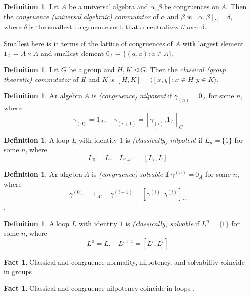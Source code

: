\documentclass[12pt]{report}
\theoremstyle{definition}
\newtheorem{fct}[thm]{Fact}
\newtheorem{dfn}[thm]{Definition}
\begin{document}
\begin{dfn}
  Let $A$ be a universal algebra and $\alpha, \beta$ be congruences on $A$. Then the
    \emph{congruence (universal algebraic) commutator} of $\alpha$ and $\beta$ is
    $[\alpha, \beta]_C = \delta$, where $\delta$ is the smallest congruence such that
    $\alpha$ centralizes $\beta$ over $\delta$. 

  Smallest here is in terms of the lattice of congruences of $A$ with largest element
    $1_A = A\times A$ and smallest element $0_A = \{(a, a) : a\in A\}$.
\end{dfn}

\begin{dfn}
  Let $G$ be a group and $H, K\unlhd G$. Then the \emph{classical (group theoretic) commutator}
    of $H$ and $K$ is $[H, K] = \langle [x, y] : x\in H, y\in K\rangle$.
\end{dfn}

\begin{dfn}
  An algebra $A$ is \emph{(congruence) nilpotent} if $\gamma_{(n)} = 0_A$ for some $n$, where
  \[\gamma_{(0)} = 1_A,\quad \gamma_{(i + 1)} = [\gamma_{(i)}, 1_A]_C\]
\end{dfn}

\begin{dfn}
  A loop $L$ with identity $1$ is \emph{(classically) nilpotent} if $L_n = \{1\}$ for some $n$, where
  \[L_0 = L,\quad L_{i + 1} = [L_i, L]\]
\end{dfn}

\begin{dfn}
  An algebra $A$ is \emph{(congruence) solvable} if $\gamma^{(n)} = 0_A$ for some $n$, where
  \[\gamma^{(0)} = 1_A,\quad \gamma^{(i + 1)} = [\gamma^{(i)}, \gamma^{(i)}]_C\].
\end{dfn}

\begin{dfn}
  A loop $L$ with identity $1$ is \emph{(classically) solvable} if $L^n = \{1\}$ for some $n$, where
  \[L^0 = L,\quad L^{i + 1} = [L^i, L^i]\]
\end{dfn}

\begin{fct}
  Classical and congruence normality, nilpotency, and solvability coincide in groups \cite{ComTheory}.
\end{fct}

\begin{fct}
  Classical and congruence nilpotency coincide in loops \cite{ComTheory}.
\end{fct}
\end{document}
